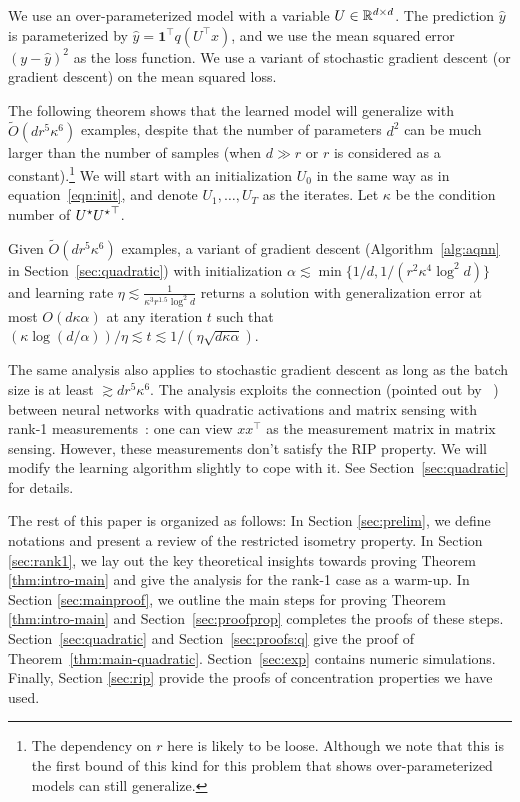 We use an over-parameterized model with a variable $U\in \mathbb{R}^{d\times d}$. The prediction $\hat{y}$ is parameterized by $\hat{y} = \mathbf{1}^\top q(U^\top x) $, 
and we use the mean squared error $(y-\hat{y})^2$ as the loss function. We use a variant of stochastic gradient descent (or gradient descent) on the mean squared loss. 

The following theorem shows that the learned model will generalize with $\tilde{O}(dr^{5} \kappa^6)$ examples, despite that the number of parameters $d^2$ can be much larger than the number of samples (when $d \gg r$ or $r$ is considered as a constant).\footnote{The dependency on $r$ here is likely to be loose. Although we note that this is the first bound of this kind for this problem that shows over-parameterized models can still generalize. } We will start with an initialization $U_0$ in the same way as in equation~\eqref{eqn:init}, and denote $U_1,\dots, U_T$ as the iterates. Let $\kappa$ be the condition number of ${{U}^\star} {{{U}^\star}}^\top$. 



\begin{thm}\label{thm:main-quadratic}
Given $\tilde{O}(dr^5\kappa^6)$ examples, 	a variant of gradient descent (Algorithm~\ref{alg:aqnn} in Section~\ref{sec:quadratic}) with initialization $\alpha \lesssim \min\{1/d, 1/(r^2\kappa^4\log^2 d)\}$ and learning rate $\eta \lesssim \frac{1}{\kappa^3 r^{1.5} \log^2 d}$ returns a solution with generalization error at most $O(d\kappa \alpha)$ at any iteration $t$ such that  $(\kappa\log (d/\alpha))/\eta \lesssim t \lesssim 1/(\eta\sqrt{d\kappa \alpha})$. 
\end{thm}

\noindent The same analysis also applies to stochastic gradient descent as long as the batch size is at least $\gtrsim dr^5\kappa^6$. The analysis exploits the connection (pointed out by ~\cite{2017arXiv170704926S}) between neural networks with quadratic activations and matrix sensing with rank-1 measurements~\cite{kueng2017low, zhong2015efficient,chen2015exact}: one can view $xx^\top$ as the measurement matrix in matrix sensing. However, these measurements don't satisfy the RIP property.  We will modify the learning algorithm slightly to cope with it. See Section~\ref{sec:quadratic} for details. 


The rest of this paper is organized as follows:
In Section \ref{sec:prelim}, we define notations and present a review of the restricted isometry property. 
In Section \ref{sec:rank1}, we lay out the key theoretical insights towards proving Theorem \ref{thm:intro-main} and give the analysis for the rank-1 case as a warm-up. 
In Section \ref{sec:mainproof}, we outline the main steps for proving Theorem \ref{thm:intro-main} and Section~\ref{sec:proofprop} completes the proofs of these steps. Section~\ref{sec:quadratic} and Section~\ref{sec:proofs:q} give the proof of Theorem~\ref{thm:main-quadratic}. Section~\ref{sec:exp} contains numeric simulations. 
Finally, Section \ref{sec:rip} provide the proofs of concentration properties we have used.
